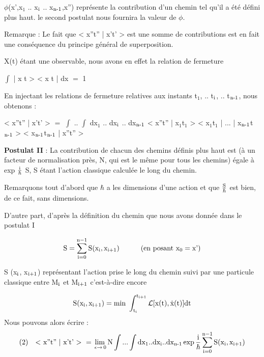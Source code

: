 $\phi$(x',x$_1$ .. x$_{\text{i}}$ .. x$_{\text{n-1}}$,x'') représente la contribution d'un chemin tel
qu'il a été défini plus haut. le second postulat nous fournira la valeur
de $\phi$.

Remarque : Le fait que < x''t'' | x't' > est une somme de contributions est
en fait une conséquence du principe général de superposition.

X(t) étant une observable, nous avons en effet la relation de
fermeture

\begin{center}
$\int$ | x t > < x t | dx $=$ 1
\end{center}

En injectant les relations de fermeture relatives aux instants
t$_1$, .. t$_{\text{i}}$, .. t$_{\text{n-1}}$, nous obtenons :


\begin{center}
< x''t'' | x't' > $=$ $\int$ .. $\int$ dx$_1$ .. dx$_{\text{i}}$ .. dx$_{\text{n-1}}$
< x''t'' | x$_1$t$_1$ > < x$_1$t$_1$ | ... | x$_{\text{n-1}}$t$_{\text{n-1}}$ > < x$_{\text{n-1}}$t$_{\text{n-1}}$ | x''t'' >
\end{center}


{\bf Postulat II} : La contribution de chacun des chemins définis plus haut est
(à un facteur de normalisation près, N, qui est le même pour tous les
chemins) égale à exp $\frac{\text{i}}{\hbar}$ S, S étant l'action classique calculée le long
du chemin.

Remarquons tout d'abord que $\hbar$ a les dimensions d'une action
et que $\frac{\text{S}}{\hbar}$ est bien, de ce fait, sans dimensions.

D'autre part, d'après la définition du chemin que nous avons
donnée dans le postulat I

\[
\text{S} = \sum_{\text{i}=0}^{\text{n}-1} \text{S} (\text{x}_{\text{i}}, \text{x}_{\text{i+1}})
 \ \ \ \ \ \ \ \ \ (\text{en posant }\text{x}_0 = \text{x'})
\]

S (x$_{\text{i}}$, x$_{\text{i+1}}$) représentant l'action prise le long du chemin suivi par
une particule classique entre M$_{\text{i}}$ et M$_{\text{i+1}}$ c'est-à-dire encore

\[
\text{S} (\text{x}_{\text{i}}, \text{x}_{\text{i+1}}) = \text{min } \int_{\text{t}_{\text{i}}}^{\text{t}_{\text{i+1}}}
\mathcal{L} [ \text{x(t)}, \dot{\text{x}}\text{(t)} ] \text{dt}
\]
Nous pouvons alors écrire :
\[
\text{(2)\ \ \ < x''t'' | x't' > } = \lim_{\,\epsilon \to \,0} \text{N} \int...\int
\text{dx}_1..\text{dx}_{\text{i}}..\text{dx}_{\text{n-1}} \exp\frac{\text{i}}{\hbar}
\sum_{\text{i}=0}^{\text{n}-1} \text{S} (\text{x}_{\text{i}}, \text{x}_{\text{i+1}})
\]

